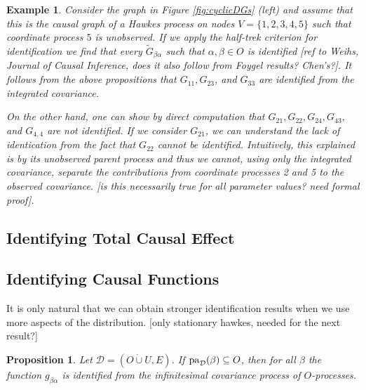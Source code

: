 \documentclass[accepted]{uai2021} %
\newtheorem{exmp}[thm]{Example}
\newtheorem{prop}[thm]{Proposition}
\newcommand{\pa}{\textnormal{pa}}
\newcommand{\disjU}{\mathbin{\dot{\cup}}}
\begin{document}
\begin{exmp}
	Consider the graph in Figure \ref{fig:cyclicDGs} (left) and assume that 
	this is the causal graph of a Hawkes process on nodes $V = \{1,2,3,4,5\}$ 
	such that coordinate process $5$ is unobserved. If we apply the half-trek 
	criterion for identification we find that every $\tilde{G}_{\beta\alpha}$ 
	such that 
	$\alpha,\beta\in O$ is identified [ref to Weihs, Journal of Causal 
	Inference, does it also follow from Foygel results? Chen's?]. It follows 
	from the 
	above propositions that $G_{11}, G_{23}$, and $G_{33}$ are identified from 
	the integrated covariance.
	
	On the other hand, one can show by direct computation that $G_{21}, G_{22}, 
	G_{24}, 
	G_{43},$ and $G_{4,4}$ are not identified. If we consider $G_{21}$, we can 
	understand the lack of identication from the fact that $G_{22}$ 
	cannot 
	be identified. 
	Intuitively, this explained is by its unobserved parent process and thus we 
	cannot, using only the integrated covariance, separate the contributions 
	from coordinate processes 2 and 5 to the observed covariance. [is this 
	necessarily true for all parameter 
	values? need formal proof]. 
\end{exmp}


\subsection{Identifying Total Causal Effect}




\subsection{Identifying Causal Functions}

It is only natural that we can obtain stronger identification results when we 
use more aspects of the distribution. [only stationary hawkes, needed for the 
next result?]

\begin{prop}
	Let $\mathcal{D} = (O\disjU U, E)$. If $\pa_\mathcal{D}(\beta) \subseteq 
	O$, then for all $\beta$ the function $g_{\beta\alpha}$ is identified from 
	the infinitesimal covariance process of $O$-processes.
	\label{prop:gPaId}
\end{prop}
\end{document}
